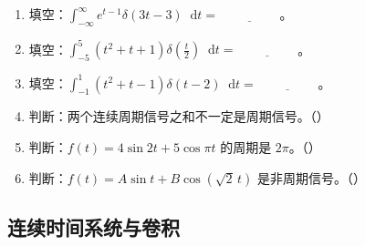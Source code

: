 \documentclass[12pt,a4paper]{ctexart}
\newcommand{\dif}{\mathop{}\!\mathrm{d}}
\begin{document}
\begin{enumerate}[label=\arabic*.]
\item 填空：\(\displaystyle \int_{-\infty}^{\infty} e^{t-1}\delta(3t-3)\dif t=\underline{\hspace{2cm}}\)。

\item 填空：\(\displaystyle \int_{-5}^{5}\left(t^2+t+1\right)\delta\left(\frac{t}{2}\right)\dif t=\underline{\hspace{2cm}}\)。

\item 填空：\(\displaystyle \int_{-1}^{1}\left(t^2+t-1\right)\delta(t-2)\dif t=\underline{\hspace{2cm}}\)。

\item 判断：两个连续周期信号之和不一定是周期信号。\quad（\qquad）

\item 判断：$f(t)=4\sin 2t+5\cos\pi t$ 的周期是 $2\pi$。\quad（\qquad）

\item 判断：$f(t)=A\sin t+B\cos(\sqrt{2}\,t)$ 是非周期信号。\quad（\qquad）
\end{enumerate}

\subsection{连续时间系统与卷积}
\end{document}
